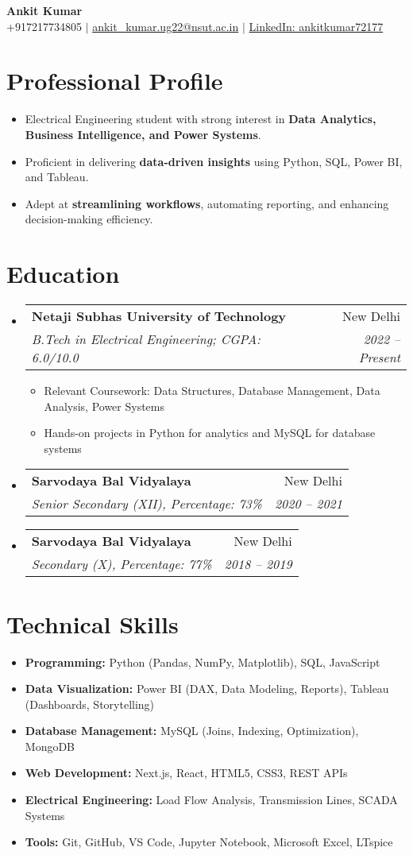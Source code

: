 \documentclass[a4paper,11pt]{article}
\makeatletter
\newcommand{\resumeItem}[1]{
  \item\small{{#1 \vspace{-2pt}}}
}
\newcommand{\resumeSubheading}[4]{
  \vspace{-2pt}\item
  \begin{tabular*}{0.97\textwidth}[t]{l@{\extracolsep{\fill}}r}
    \textbf{#1} & #2 \\
    \textit{\small#3} & \textit{\small #4} \\
  \end{tabular*}\vspace{-7pt}
}
\makeatother
\begin{document}
\begin{center}
    {\Huge \textbf{Ankit Kumar}} \\[8pt]
    \small +917217734805 $|$
    \href{mailto:ankit_kumar.ug22@nsut.ac.in}{ankit\_kumar.ug22@nsut.ac.in} $|$
    \href{https://www.linkedin.com/in/ankitkumar72177/}{LinkedIn: ankitkumar72177}
\end{center}

\vspace{10pt}

\section*{Professional Profile}
\begin{itemize}[leftmargin=*]
    \resumeItem{Electrical Engineering student with strong interest in \textbf{Data Analytics, Business Intelligence, and Power Systems}.}
    \resumeItem{Proficient in delivering \textbf{data-driven insights} using Python, SQL, Power BI, and Tableau.}
    \resumeItem{Adept at \textbf{streamlining workflows}, automating reporting, and enhancing decision-making efficiency.}
\end{itemize}

\section*{Education}
\begin{itemize}[leftmargin=*]
  \resumeSubheading
    {Netaji Subhas University of Technology}{New Delhi}
    {B.Tech in Electrical Engineering; CGPA: 6.0/10.0}{2022 -- Present}
    \begin{itemize}
        \resumeItem{Relevant Coursework: Data Structures, Database Management, Data Analysis, Power Systems}
        \resumeItem{Hands-on projects in Python for analytics and MySQL for database systems}
    \end{itemize}
  \resumeSubheading
    {Sarvodaya Bal Vidyalaya}{New Delhi}
    {Senior Secondary (XII), Percentage: 73\%}{2020 -- 2021}
  \resumeSubheading
    {Sarvodaya Bal Vidyalaya}{New Delhi}
    {Secondary (X), Percentage: 77\%}{2018 -- 2019}
\end{itemize}

\section*{Technical Skills}
\begin{itemize}[leftmargin=*]
  \resumeItem{\textbf{Programming:} Python (Pandas, NumPy, Matplotlib), SQL, JavaScript}
  \resumeItem{\textbf{Data Visualization:} Power BI (DAX, Data Modeling, Reports), Tableau (Dashboards, Storytelling)}
  \resumeItem{\textbf{Database Management:} MySQL (Joins, Indexing, Optimization), MongoDB}
  \resumeItem{\textbf{Web Development:} Next.js, React, HTML5, CSS3, REST APIs}
  \resumeItem{\textbf{Electrical Engineering:} Load Flow Analysis, Transmission Lines, SCADA Systems}
  \resumeItem{\textbf{Tools:} Git, GitHub, VS Code, Jupyter Notebook, Microsoft Excel, LTspice}
\end{itemize}
\end{document}
